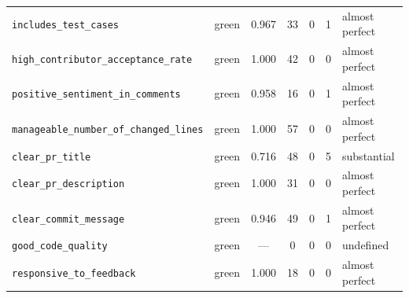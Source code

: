 \begin{table}[!htbp]
\begin{tabular}{llccccl}
\texttt{includes\_test\_cases} & green & 0.967 & 33 & 0 & 1 & almost perfect \\
\texttt{high\_contributor\_acceptance\_rate} & green & 1.000 & 42 & 0 & 0 & almost perfect \\
\texttt{positive\_sentiment\_in\_comments} & green & 0.958 & 16 & 0 & 1 & almost perfect \\
\texttt{manageable\_number\_of\_changed\_lines} & green & 1.000 & 57 & 0 & 0 & almost perfect \\
\texttt{clear\_pr\_title} & green & 0.716 & 48 & 0 & 5 & substantial \\
\texttt{clear\_pr\_description} & green & 1.000 & 31 & 0 & 0 & almost perfect \\
\texttt{clear\_commit\_message} & green & 0.946 & 49 & 0 & 1 & almost perfect \\
\texttt{good\_code\_quality} & green & --- & 0 & 0 & 0 & undefined \\
\texttt{responsive\_to\_feedback} & green & 1.000 & 18 & 0 & 0 & almost perfect \\
\bottomrule
\end{tabular}
\end{table}
